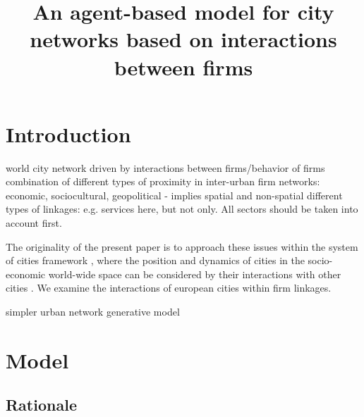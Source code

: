 \documentclass{article}
\title{An agent-based model for city networks based on interactions between firms}
\date{}
\begin{document}
\maketitle

\section{Introduction}

\citep{taylor2001specification} world city network driven by interactions between firms/behavior of firms
\citep{martinus2018global} combination of different types of proximity in inter-urban firm networks: economic, sociocultural, geopolitical - implies spatial and non-spatial 
\citep{pan2017mapping} different types of linkages: e.g. services here, but not only. All sectors should be taken into account first.

The originality of the present paper is to approach these issues within the system of cities framework \citep{berry1964cities}, where the position and dynamics of cities in the socio-economic world-wide space can be considered by their interactions with other cities \citep{pumain1997pour}. We examine the interactions of european cities within firm linkages. 

\cite{dai2016generative} simpler urban network generative model


\section{Model}

\subsection{Rationale}
\end{document}
